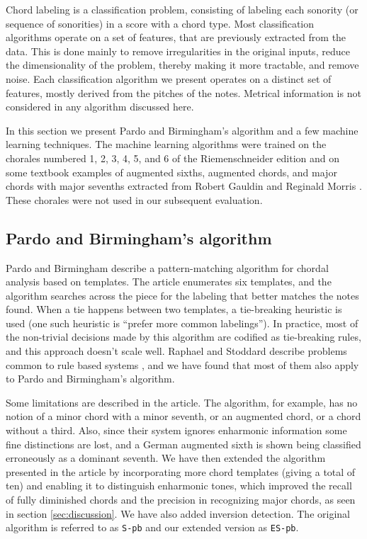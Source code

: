 Chord labeling is a classification problem, consisting of labeling
each sonority (or sequence of sonorities) in a score with a chord
type. Most classification algorithms operate on a set of features,
that are previously extracted from the data. This is done mainly to
remove irregularities in the original inputs, reduce the
dimensionality of the problem, thereby making it more tractable, and
remove noise. Each classification algorithm we present operates on a
distinct set of features, mostly derived from the pitches of the
notes. Metrical information is not considered in any algorithm
discussed here.

In this section we present Pardo and Birmingham's algorithm and a few
machine learning techniques. The machine learning algorithms were
trained on the chorales numbered 1, 2, 3, 4, 5, and 6 of the
Riemenschneider edition and on some textbook examples of augmented
sixths, augmented chords, and major chords with major sevenths
extracted from Robert Gauldin \cite{gauldin05:harmonic} and Reginald
Morris \cite{morris33:figured}. These chorales were not used in our
subsequent evaluation.

\subsection{Pardo and Birmingham's algorithm}
\label{sec:pardo}


Pardo and Birmingham \cite{barthelemy.ea01:figured} describe a
pattern-matching algorithm for chordal analysis based on templates.
The article enumerates six templates, and the algorithm searches
across the piece for the labeling that better matches the notes found.
When a tie happens between two templates, a tie-breaking heuristic is
used (one such heuristic is ``prefer more common labelings''). In
practice, most of the non-trivial decisions made by this algorithm are
codified as tie-breaking rules, and this approach doesn't scale
well. Raphael and Stoddard describe problems common to rule based
systems \cite{raphael.ea03:harmonic}, and we have found that most of
them also apply to Pardo and Birmingham's algorithm.

Some limitations are described in the article. The algorithm, for
example, has no notion of a minor chord with a minor seventh, or an
augmented chord, or a chord without a third. Also, since their system
ignores enharmonic information some fine distinctions are lost, and a
German augmented sixth is shown being classified erroneously as a
dominant seventh. We have then extended the algorithm presented in the
article by incorporating more chord templates (giving a total of ten)
and enabling it to distinguish enharmonic tones, which improved the
recall of fully diminished chords and the precision in recognizing
major chords, as seen in section \ref{sec:discussion}. We have also
added inversion detection. The original algorithm is referred to as
\texttt{S-pb} and our extended version as \texttt{ES-pb}.

